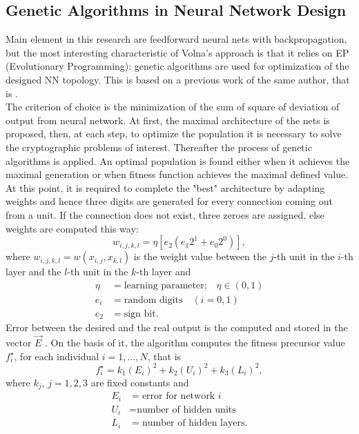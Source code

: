 \documentclass[%
    corpo=11pt,
    twoside,
    stile=classica,
    oldstyle,
    autoretitolo,
    tipotesi=magistrale,
    greek,
    evenboxes,
    english
]{toptesi}
\begin{document}
\subsection{Genetic Algorithms in Neural Network Design}
Main element in this research are feedforward neural nets with backpropagation, but the most interesting characteristic of Volna's approach is that it relies on EP (Evolutionary Programming): genetic algorithms are used for optimization of the designed NN topology. This is based on a previous work of the same author, that is \cite{volna2}. \\
The criterion of choice is the minimization of the sum of square of deviation of output from neural network. At first, the maximal architecture of the nets is proposed, then, at each step, to optimize the population it is necessary to solve the cryptographic problems of interest. Thereafter the process of genetic algorithms is applied. An optimal population is found either when it achieves the maximal generation or when fitness function achieves the maximal defined value. \\
At this point, it is required to complete the "best" architecture by adapting weights and hence three digits are generated for every
connection coming out from a unit. If the connection does not exist, three zeroes are assigned, else weights are computed this way:
\begin{equation}
w_{i,j,k,l} = \eta[e_2(e_1 2^1 + e_0 2^0)],
\end{equation}
where $w_{i,j,k,l} = w(x_{i,j}, x_{k,l})$ is the weight value between the $j$-th unit in the $i$-th layer and the $l$-th unit in the $k$-th layer and
\begin{align*}
    \eta &= \text{learning parameter;} \quad \eta \in (0,1)\\
    e_i &= \text{random digits} \quad (i=0,1)\\
  	e_2 &= \text{sign bit}.
\end{align*}
Error between the desired and the real output is the computed and stored in the vector $\vec{E}$ . On the basis of it, the algorithm computes the fitness precursor value $f_i^{\star}$, for each individual $i = 1, \dots, N$, that is
\begin{equation}
f_i^{\star} = k_1(E_i)^2 + k_2(U_i)^2 + k_3(L_i)^2,
\end{equation}
where $k_j$, $j = 1,2,3$ are fixed constants and
\begin{align*}
    E_i &= \text{error for network }i\\
    U_i &= \text{number of hidden units}\\
  	L_i &= \text{number of hidden layers}.
\end{align*}
\end{document}
